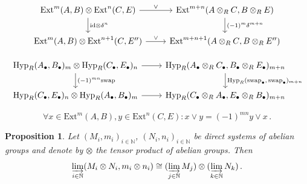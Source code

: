 \documentclass[10pt,a4paper]{amsart}
\newtheorem{prop}{Proposition}
\begin{document}
\begin{equation}\label{diag:extandconnsecond}
\begin{tikzcd}
    \mathrm{Ext}^m(A{,} \, B) \otimes \mathrm{Ext}^n(C{,} \, E) \arrow[r, "\vee"] \arrow[d, "\mathrm{id} \otimes \delta^n"] & \mathrm{Ext}^{m+n}(A \otimes_R C{,} \, B \otimes_R E) \arrow[d, "(-1)^m \delta^{m+n}"] \\
    \mathrm{Ext}^m(A{,} \, B) \otimes \mathrm{Ext}^{n+1}(C{,} \, E'') \arrow[r, "\vee"] & \mathrm{Ext}^{m+n+1}(A \otimes_R C{,} \, B \otimes_R E'')
\end{tikzcd}
\end{equation}

\begin{equation}\label{diag:extprodcommity}
\begin{tikzcd}
    \mathrm{Hyp}_R(A_{\bullet}{,} \, B_{\bullet})_m \otimes \mathrm{Hyp}_R(C_{\bullet}{,} \, E_{\bullet})_n \arrow[r] \arrow[d, "(-1)^{mn}\mathrm{swap}"] & \mathrm{Hyp}_R(A_{\bullet} \otimes_R C_{\bullet}{,} \, B_{\bullet} \otimes_R E_{\bullet})_{m+n} \arrow[d, "\mathrm{Hyp}_R(\mathrm{swap}_{\bullet}{,} \, \mathrm{swap}_{\bullet})_{m+n}"] \\
    \mathrm{Hyp}_R(C_{\bullet}{,} \, E_{\bullet})_n \otimes \mathrm{Hyp}_R(A_{\bullet}{,} \, B_{\bullet})_m \arrow[r] & \mathrm{Hyp}_R(C_{\bullet} \otimes_R A_{\bullet}{,} \, E_{\bullet} \otimes_R B_{\bullet})_{m+n}
\end{tikzcd}
\end{equation}

\begin{equation}\label{eq:extprodgradedcomm}
\forall x \in \mathrm{Ext}^m(A, B), y \in \mathrm{Ext}^n(C, E):
x \vee y = (-1)^{mn} y \vee x \, .
\end{equation}

\begin{prop}\label{prop:dirlimcommswithtensor}
Let $(M_i, m_i)_{i \in \mathbb{N}}$, $(N_i, n_i)_{i \in \mathbb{N}}$ be direct systems of abelian groups and denote by $\otimes$ the tensor product of abelian groups. Then
\[ \varinjlim_{i \in \mathbb{N}} (M_i \otimes N_i, m_i \otimes n_i) \cong (\varinjlim_{j \in \mathbb{N}} M_j) \otimes (\varinjlim_{k \in \mathbb{N}} N_k) \, . \]
\end{prop}
\end{document}
